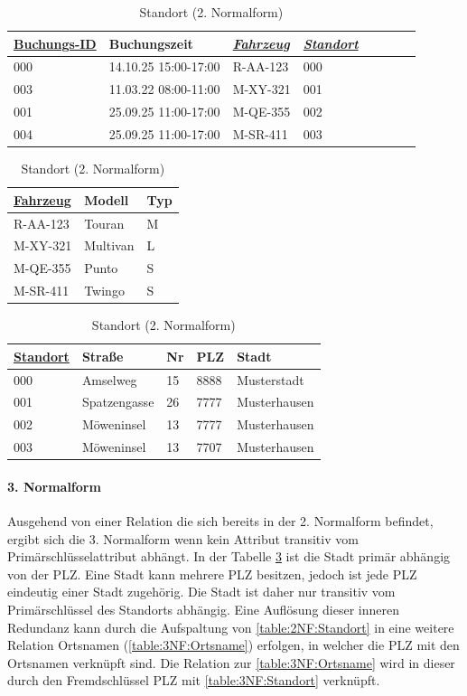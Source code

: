 \begin{table}[!ht]
	\centering
	\caption{Buchung (2. Normalform)}\label{table:2NF:Buchung}
	\begin{tabular}{llllllll} \toprule
		\underline{Buchungs-ID} & Buchungszeit & \textit{\underline{Fahrzeug}} & \textit{\underline{Standort}}	 \\ 
		\midrule
		000&  14.10.25 15:00-17:00  & R-AA-123 & 000 \\
		003&   11.03.22 08:00-11:00 & M-XY-321 & 001  \\
		001&   25.09.25 11:00-17:00 & M-QE-355 & 002  \\
		004&   25.09.25 11:00-17:00 & M-SR-411 & 003  \\
		\bottomrule
	\end{tabular}

	\parbox{.35\linewidth}{
	\centering
	\caption{Fahrzeug (2. Normalform)}\label{table:2NF:Fahrzeug}
	\begin{tabular}{lll} \toprule
		\underline{Fahrzeug} 	& Modell & Typ \\ 
		\midrule
		R-AA-123 & Touran & M    \\
		M-XY-321 & Multivan & L  \\
		M-QE-355 & Punto & S     \\
		M-SR-411 & Twingo & S    \\
		\bottomrule
	\end{tabular}
	}
	\hfill
	\parbox{.62\linewidth}{
	\centering
	\caption{Standort (2. Normalform)}\label{table:2NF:Standort}
	\begin{tabular}{lllll} \toprule
	\underline{Standort} 	& Stra\ss e & Nr & PLZ & Stadt \\ 
	\midrule
	000 & Amselweg & 15 & 8888 & Musterstadt \\
	001 & Spatzengasse & 26 & 7777 & Musterhausen \\
	002 & Möweninsel & 13 & 7777 & Musterhausen \\
	003 & Möweninsel & 13 & 7707 & Musterhausen \\
	\bottomrule
\end{tabular}
	}
\end{table}

\paragraph{3. Normalform}
Ausgehend von einer Relation die sich bereits in der 2. Normalform befindet, ergibt sich die 3. Normalform wenn kein Attribut transitiv vom Primärschlüsselattribut abhängt. In der Tabelle \ref{table:2NF:Standort} ist die Stadt primär abhängig von der PLZ. Eine Stadt kann mehrere PLZ besitzen, jedoch ist jede PLZ eindeutig einer Stadt zugehörig. Die Stadt ist daher nur transitiv vom Primärschlüssel des Standorts abhängig. Eine Auflösung dieser inneren Redundanz kann durch die Aufspaltung von \autoref{table:2NF:Standort} in eine weitere Relation Ortsnamen (\autoref{table:3NF:Ortsname}) erfolgen, in welcher die PLZ mit den Ortsnamen verknüpft sind. Die Relation zur \autoref{table:3NF:Ortsname} wird in dieser durch den Fremdschlüssel PLZ mit \autoref{table:3NF:Standort} verknüpft.

